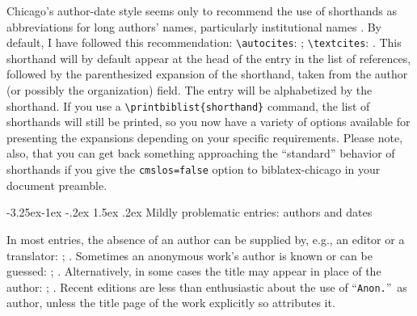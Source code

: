 \documentclass[a4paper,12pt]{article}
\makeatletter
\newcommand{\cmd}[1]{\texttt{\textbackslash #1}}
\renewcommand{\section}{\@startsection{section}{1}{\z@}%
                                     {-3.25ex\@plus -1ex \@minus -.2ex}%
                                     {1.5ex \@plus .2ex}%
                                     {\normalfont\large\bfseries}}
\makeatother
\begin{document}
Chicago's author-date style
 seems only to recommend
the use of shorthands as abbreviations for long authors' names,
particularly institutional names \autocite[15.37]{chicago:manual}.  By
default, I have followed this recommendation: \cmd{autocites}:
\autocites{bsi:abbreviation}{iso:electrodoc}; \cmd{textcites}:
\textcites{bsi:abbreviation}{iso:electrodoc}.  This \textsf{shorthand}
will by default appear at the head of the entry in the list of
references, followed by the parenthesized expansion of the shorthand,
taken from the \textsf{author} (or possibly the \textsf{organization})
field.  The entry will be alphabetized by the \textsf{shorthand}.  If
you use a \cmd{printbiblist\{shorthand\}} command, the list of
shorthands will still be printed, so you now have a variety of options
available for presenting the expansions depending on your specific
requirements.  Please note, also, that you can get back something
approaching the \enquote{standard} behavior of shorthands if you give
the \texttt{cmslos=false} option to \textsf{biblatex-chicago} in your
document preamble.

\section{Mildly problematic entries: authors and dates}
\label{sec:problematic}

In most  entries, the absence of
an author can be supplied by, e.g., an editor or a translator:
\autocite{chaucer:alt}; \autocite{silver:gawain}.  Sometimes an
anonymous work's author is known or can be guessed:
\autocite{horsley:prosodies}; \autocite{cook:sotweed}.  Alternatively,
in some cases the \textsf{title} may appear in place of the
\textsf{author}: \autocite{anon:stanze};
\autocite{virginia:plantation}.  Recent editions are less than
enthusiastic about the use of \enquote{\texttt{Anon.}}\ as author,
unless the title page of the work explicitly so attributes it.
\end{document}
